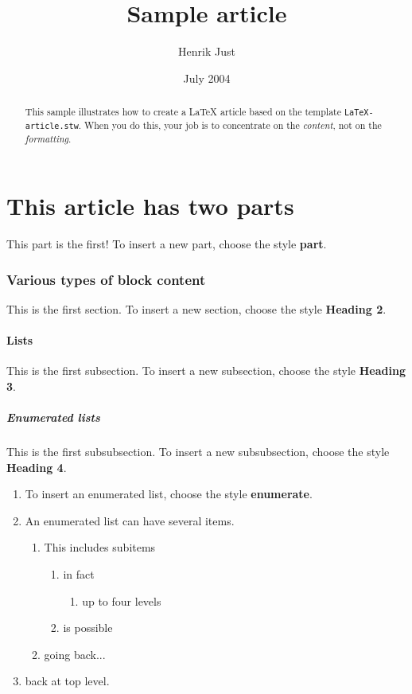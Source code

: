 \documentclass[12pt]{article}
\begin{document}
\title{Sample article}

\author{Henrik Just}

\date{July 2004}

\maketitle
\renewcommand\abstractname{Abstract}

\begin{abstract}
This sample illustrates how to create a LaTeX article based on the
template \texttt{LaTeX{}-article.stw}. When you do this, your job is to
concentrate on the \emph{content}, not on the \emph{formatting}.

\end{abstract}
\setcounter{tocdepth}{5}
\renewcommand\contentsname{Table of Contents}
\tableofcontents
\part{This article has two parts}
This part is the first! To insert a new part, choose the style
\textbf{part}.

\section{\label{ref:example}Various types of block content}
This is the first section. To insert a new section, choose the style
\textbf{Heading 2}.

\subsection{Lists}
This is the first subsection. To insert a new subsection, choose the
style \textbf{Heading 3}.

\subsubsection{Enumerated lists}
This is the first subsubsection. To insert a new subsubsection, choose
the style \textbf{Heading 4}.

\begin{enumerate}
\item To insert an enumerated list, choose the style \textbf{enumerate}.
\item An enumerated list can have several items.

\begin{enumerate}
\item This includes subitems

\begin{enumerate}
\item in fact

\begin{enumerate}
\item up to four levels
\end{enumerate}
\item is possible
\end{enumerate}
\item going back...
\end{enumerate}
\item back at top level.
\end{enumerate}
\end{document}
